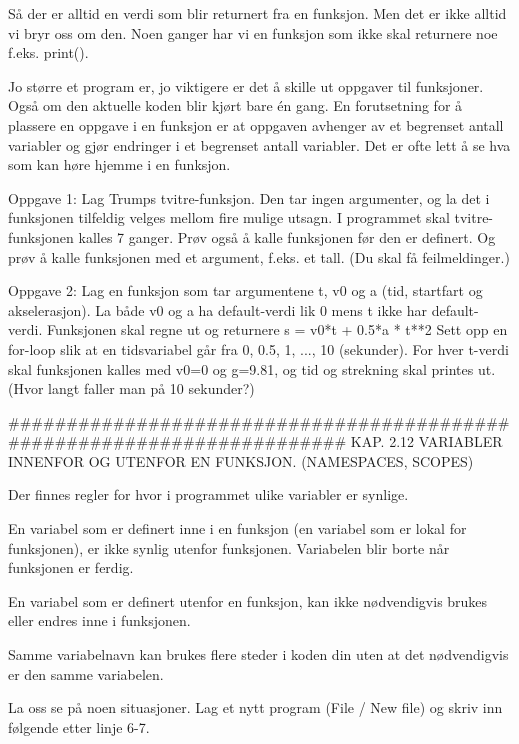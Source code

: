 \documentclass[a4paper,11pt,utf8]{book}
\begin{document}
Så der er alltid en verdi som blir returnert fra en funksjon.
Men det er ikke alltid vi bryr oss om den.
Noen ganger har vi en funksjon som ikke skal returnere noe f.eks. print(). 



Jo større et program er, jo viktigere er det å skille ut oppgaver til funksjoner.
Også om den aktuelle koden blir kjørt bare én gang. 
En forutsetning for å plassere en oppgave i en funksjon 
er at oppgaven avhenger av et begrenset antall variabler 
og gjør endringer i et begrenset antall variabler. 
Det er ofte lett å se hva som kan høre hjemme i en funksjon. 



Oppgave 1: Lag Trumps tvitre-funksjon. Den tar ingen argumenter, 
og la det i funksjonen tilfeldig velges mellom fire mulige utsagn. 
I programmet skal tvitre-funksjonen kalles 7 ganger. 
Prøv også å kalle funksjonen før den er definert. 
Og prøv å kalle funksjonen med et argument, f.eks. et tall. 
(Du skal få feilmeldinger.) 


Oppgave 2: Lag en funksjon som tar argumentene t, v0 og a 
(tid, startfart og akselerasjon).
La både v0 og a ha default-verdi lik 0 mens t ikke har default-verdi. 
Funksjonen skal regne ut og returnere  s = v0*t + 0.5*a * t**2
Sett opp en for-loop slik at en tidsvariabel går fra 0, 0.5, 1, ..., 10 (sekunder).
For hver t-verdi skal funksjonen kalles med v0=0 og g=9.81, 
og tid og strekning skal printes ut.
(Hvor langt faller man på 10 sekunder?) 





######################################################################## 
KAP. 2.12  VARIABLER INNENFOR OG UTENFOR EN FUNKSJON. 
(NAMESPACES, SCOPES)

Der finnes regler for hvor i programmet ulike variabler er synlige. 

En variabel som er definert inne i en funksjon (en variabel som er 
lokal for funksjonen), er ikke synlig utenfor funksjonen. 
Variabelen blir borte når funksjonen er ferdig. 

En variabel som er definert utenfor en funksjon, kan ikke nødvendigvis 
brukes eller endres inne i funksjonen. 

Samme variabelnavn kan brukes flere steder i koden din uten at det 
nødvendigvis er den samme variabelen.


La oss se på noen situasjoner. 
Lag et nytt program (File / New file) og skriv inn følgende etter linje 6-7.
\end{document}
